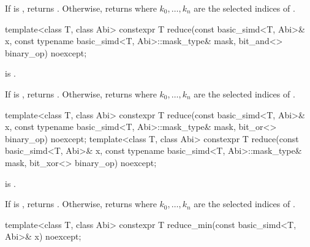 \begin{itemdescr}
  \pnum\returns
  If  is , returns . Otherwise, returns
   where $k_0, \ldots, k_n$ are the selected indices of .
\end{itemdescr}

\begin{itemdecl}
template<class T, class Abi>
  constexpr T reduce(const basic_simd<T, Abi>& x, const typename basic_simd<T, Abi>::mask_type& mask,
                     bit_and<> binary_op) noexcept;
\end{itemdecl}

\begin{itemdescr}
  \pnum\constraints
   is .

  \pnum\returns
  If  is , returns . Otherwise, returns
   where $k_0, \ldots, k_n$ are the selected indices of .
\end{itemdescr}

\begin{itemdecl}
template<class T, class Abi>
  constexpr T reduce(const basic_simd<T, Abi>& x, const typename basic_simd<T, Abi>::mask_type& mask,
                     bit_or<> binary_op) noexcept;
template<class T, class Abi>
  constexpr T reduce(const basic_simd<T, Abi>& x, const typename basic_simd<T, Abi>::mask_type& mask,
                     bit_xor<> binary_op) noexcept;
\end{itemdecl}

\begin{itemdescr}
  \pnum\constraints
   is .

  \pnum\returns
  If  is , returns . Otherwise, returns
   where $k_0, \ldots, k_n$ are the selected indices of .
\end{itemdescr}

\begin{itemdecl}
template<class T, class Abi> constexpr T reduce_min(const basic_simd<T, Abi>& x) noexcept;
\end{itemdecl}

